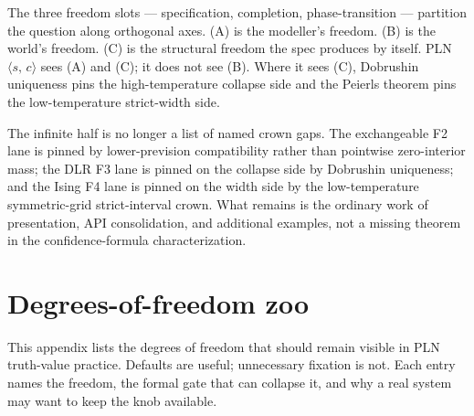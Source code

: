 \documentclass[]{article}
\newcommand{\STV}[2]{\langle #1,\, #2 \rangle}
\begin{document}
The three freedom slots --- specification, completion, phase-transition
--- partition the question along orthogonal axes. (A) is the modeller's
freedom. (B) is the world's freedom. (C) is the structural freedom
the spec produces by itself. PLN $\STV{s}{c}$ sees (A) and (C); it
does not see (B). Where it sees (C), Dobrushin uniqueness pins the
high-temperature collapse side and the Peierls theorem pins the
low-temperature strict-width side.

The infinite half is no longer a list of named crown gaps. The exchangeable
F2 lane is pinned by lower-prevision compatibility rather than pointwise
zero-interior mass; the DLR F3 lane is pinned on the collapse side by
Dobrushin uniqueness; and the Ising F4 lane is pinned on the width side by
the low-temperature symmetric-grid strict-interval crown. What remains is
the ordinary work of presentation, API consolidation, and additional
examples, not a missing theorem in the confidence-formula characterization.

\appendix

\section{Degrees-of-freedom zoo}\label{app:dof-zoo}

This appendix lists the degrees of freedom that should remain visible in
PLN truth-value practice. Defaults are useful; unnecessary fixation is not.
Each entry names the freedom, the formal gate that can collapse it, and why a
real system may want to keep the knob available.
\end{document}

